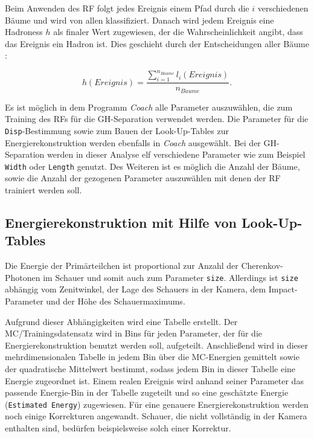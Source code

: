 Beim Anwenden des RF folgt jedes Ereignis einem Pfad durch die $i$ verschiedenen Bäume und wird von allen klassifiziert.
Danach wird jedem Ereignis eine Hadroness $h$ als finaler Wert zugewiesen, der die Wahrscheinlichkeit angibt, dass das Ereignis ein Hadron ist.
Dies geschieht durch der Entscheidungen aller Bäume \cite{RandomForestForMAGIC}: 

\begin{equation}
 h(Ereignis)=\frac{ \sum_{i=1} ^{n_{B\ddot{a}ume}} l_i(Ereignis)}{n_{B\ddot{a}ume}}.
\end{equation}

Es ist möglich in dem Programm \textit{Coach} alle Parameter auszuwählen, die zum Training des RFs für die GH-Separation verwendet werden.
Die Parameter für die \texttt{Disp}-Bestimmung sowie zum Bauen der Look-Up-Tables zur Energierekonstruktion werden ebenfalls in \textit{Coach} ausgewählt.
Bei der GH-Separation werden in dieser Analyse elf verschiedene Parameter wie zum Beispiel \texttt{Width} oder \texttt{Length} genutzt.
Des Weiteren ist es möglich die Anzahl der Bäume, sowie die Anzahl der gezogenen Parameter auszuwählen mit denen der RF trainiert werden soll.

\subsection{Energierekonstruktion mit Hilfe von Look-Up-Tables}
Die Energie der Primärteilchen ist proportional zur Anzahl der Cherenkov-Photonen im Schauer und somit auch zum Parameter \texttt{size}.
Allerdings ist \texttt{size} abhängig vom Zenitwinkel, der Lage des Schauers in der Kamera, dem Impact-Parameter und der Höhe des Schauermaximums.\cite{EnergieRekonstruktion}

Aufgrund dieser Abhängigkeiten wird eine Tabelle erstellt.
Der MC\-/Trainingsdatensatz wird in Bins für jeden Parameter, der für die Energierekonstruktion benutzt werden soll, aufgeteilt.
Anschließend wird in dieser mehrdimensionalen Tabelle in jedem Bin über die MC-Energien gemittelt sowie der quadratische Mittelwert bestimmt, sodass jedem Bin in dieser Tabelle eine Energie zugeordnet ist.
Einem realen Ereignis wird anhand seiner Parameter das passende Energie-Bin in der Tabelle zugeteilt und so eine geschätzte Energie (\texttt{Estimated Energy}) zugewiesen.
Für eine genauere Energierekonstruktion werden noch einige Korrekturen angewandt.
Schauer, die nicht vollständig in der Kamera enthalten sind, bedürfen beispielsweise solch einer Korrektur.\cite{EnergieRekonstruktion}

